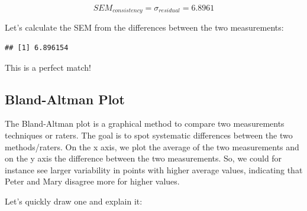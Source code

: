 \documentclass[
]{book}
\newenvironment{Shaded}{\begin{snugshade}}{\end{snugshade}}
\newcommand{\AttributeTok}[1]{\textcolor[rgb]{0.13,0.29,0.53}{#1}}
\newcommand{\CommentTok}[1]{\textcolor[rgb]{0.56,0.35,0.01}{\textit{#1}}}
\newcommand{\DecValTok}[1]{\textcolor[rgb]{0.00,0.00,0.81}{#1}}
\newcommand{\FloatTok}[1]{\textcolor[rgb]{0.00,0.00,0.81}{#1}}
\newcommand{\FunctionTok}[1]{\textcolor[rgb]{0.13,0.29,0.53}{\textbf{#1}}}
\newcommand{\NormalTok}[1]{#1}
\newcommand{\OtherTok}[1]{\textcolor[rgb]{0.56,0.35,0.01}{#1}}
\newcommand{\SpecialCharTok}[1]{\textcolor[rgb]{0.81,0.36,0.00}{\textbf{#1}}}
\newcommand{\StringTok}[1]{\textcolor[rgb]{0.31,0.60,0.02}{#1}}
\begin{document}
\[SEM_{consistency} = \sigma_{residual} = 6.8961\]

Let's calculate the SEM from the differences between the two measurements:

\begin{Shaded}
\end{Shaded}

\begin{verbatim}
## [1] 6.896154
\end{verbatim}

This is a perfect match!

\subsection{Bland-Altman Plot}\label{bland-altman-plot}

The Bland-Altman plot is a graphical method to compare two measurements
techniques or raters. The goal is to spot systematic differences between the two
methods/raters. On the x axis, we plot the average of the two measurements
and on the y axis the difference between the two measurements. So, we could
for instance see larger variability in points with higher average values,
indicating that Peter and Mary disagree more for higher values.

Let's quickly draw one and explain it:

\begin{Shaded}
\end{Shaded}
\end{document}

